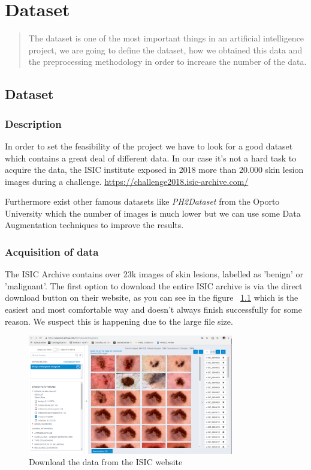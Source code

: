 \chapter{Dataset}

\begin{abstract}
The dataset is one of the most important things in an artificial intelligence project, we are going to define the dataset, how we obtained this data and the preprocessing methodology in order to increase the number of the data. 
\end{abstract}

\section[Dataset]{Dataset}
\subsection{Description}
In order to set the feasibility of the project we have to look for a good dataset which contains a great deal of different data. In our case it's not a hard task to acquire the data, the ISIC institute exposed in 2018 more than 20.000 skin lesion images during a challenge. 
\url{https://challenge2018.isic-archive.com/}

Furthermore exist other famous datasets like \emph{PH2Dataset} from the Oporto University which the number of images is much lower but we can use some Data Augmentation techniques to improve the results.

\subsection{Acquisition of data}

The ISIC Archive contains over 23k images of skin lesions, labelled as 'benign' or 'malignant'. The first option to download the entire ISIC archive is via the direct download button on their website, as you can see in the figure ~\ref{fig:isicweb} which is the easiest and most comfortable way and doesn't always finish successfully for some reason. We suspect this is happening due to the large file size. 


\begin{figure}[H]
\centering
\includegraphics[width=0.8\textwidth]{./figures/isic-dataset}
\caption{Download the data from the ISIC website}
\label{fig:isicweb}
\end{figure}

